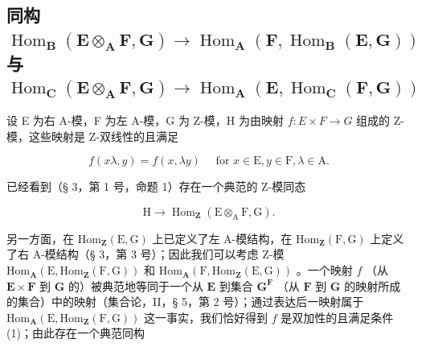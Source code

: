 \subsection{\texorpdfstring{同构 \(\operatorname{Hom}_{\mathbf{B}}(\mathbf{E} \otimes_{\mathbf{A}} \mathbf{F}, \mathbf{G}) \to \operatorname{Hom}_{\mathbf{A}}(\mathbf{F}, \operatorname{Hom}_{\mathbf{B}}(\mathbf{E}, \mathbf{G}))\) 与 \(\operatorname{Hom}_{\mathbf{C}}(\mathbf{E} \otimes_{\mathbf{A}} \mathbf{F}, \mathbf{G}) \to \operatorname{Hom}_{\mathbf{A}}(\mathbf{E}, \operatorname{Hom}_{\mathbf{C}}(\mathbf{F}, \mathbf{G}))\)}{同构 \textbackslash operatorname\{Hom\}\_\{\textbackslash mathbf\{B\}\}(\textbackslash mathbf\{E\} \textbackslash otimes\_\{\textbackslash mathbf\{A\}\} \textbackslash mathbf\{F\}, \textbackslash mathbf\{G\}) \textbackslash 到 \textbackslash operatorname\{Hom\}\_\{\textbackslash mathbf\{A\}\}(\textbackslash mathbf\{F\}, \textbackslash operatorname\{Hom\}\_\{\textbackslash mathbf\{B\}\}(\textbackslash mathbf\{E\}, \textbackslash mathbf\{G\})) 且 \textbackslash operatorname\{Hom\}\_\{\textbackslash mathbf\{C\}\}(\textbackslash mathbf\{E\} \textbackslash otimes\_\{\textbackslash mathbf\{A\}\} \textbackslash mathbf\{F\}, \textbackslash mathbf\{G\}) \textbackslash 到 \textbackslash operatorname\{Hom\}\_\{\textbackslash mathbf\{A\}\}(\textbackslash mathbf\{E\}, \textbackslash operatorname\{Hom\}\_\{\textbackslash mathbf\{C\}\}(\textbackslash mathbf\{F\}, \textbackslash mathbf\{G\}))}}

设 E 为右 A-模，F 为左 A-模，G 为 Z-模，H 为由映射 \(f: E \times F \rightarrow G\) 组成的 Z-模，这些映射是 Z-双线性的且满足

\[
f (x \lambda , y) = f (x, \lambda y) \quad \text { for } x \in \mathrm{E}, y \in \mathrm{F}, \lambda \in \mathrm{A}.\tag{1}
\]

已经看到（§ 3，第 1 号，命题 1）存在一个典范的 Z-模同态

\[
\mathrm{H} \rightarrow \operatorname{Hom} _ {\mathbf {Z}} (\mathrm{E} \otimes_ {\mathrm{A}} \mathrm{F}, \mathrm{G}).\tag{2}
\]

另一方面，在 \(\mathrm{Hom}_{\mathbf{Z}}(\mathrm{E},\mathrm{G})\) 上已定义了左 A-模结构，在 \(\mathrm{Hom}_{\mathbf{Z}}(\mathrm{F},\mathrm{G})\) 上定义了右 A-模结构（§ 3，第 3 号）；因此我们可以考虑 Z-模 \(\mathrm{Hom}_{\mathbf{A}}(\mathrm{E},\mathrm{Hom}_{\mathbf{Z}}(\mathrm{F},\mathrm{G}))\) 和 \(\mathrm{Hom}_{\mathbf{A}}(\mathrm{F},\mathrm{Hom}_{\mathbf{Z}}(\mathrm{E},\mathrm{G}))\) 。一个映射 \(f\) （从 \(\mathbf{E} \times \mathbf{F}\) 到 \(\mathbf{G}\) 的）被典范地等同于一个从 \(\mathbf{E}\) 到集合 \(\mathbf{G}^{\mathbf{F}}\) （从 \(\mathbf{F}\) 到 \(\mathbf{G}\) 的映射所成的集合）中的映射（集合论，II，§ 5，第 2 号）；通过表达后一映射属于 \(\mathrm{Hom}_{\mathbf{A}}(\mathrm{E},\mathrm{Hom}_{\mathbf{Z}}(\mathrm{F},\mathrm{G}))\) 这一事实，我们恰好得到 \(f\) 是双加性的且满足条件 (1)；由此存在一个典范同构

